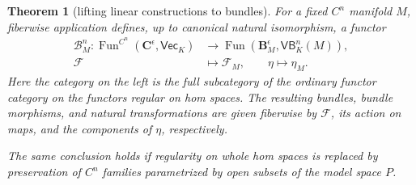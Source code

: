 \documentclass[11pt]{amsart}
\newtheorem{theorem}{Theorem}[section]
\theoremstyle{definition}
\theoremstyle{remark}
\numberwithin{equation}{section}
\theoremstyle{plain}
\theoremstyle{definition}
\theoremstyle{plain}
\begin{document}
\begin{theorem}[lifting linear constructions to bundles]\label{thm:bundle-lifting}
For a fixed $C^n$ manifold $M$, fiberwise application defines, up to canonical natural isomorphism, a functor
\[
\begin{aligned}
 \mathcal B_M^n\colon
 \operatorname{Fun}^{C^n}(\mathbf C^\epsilon,\mathsf{Vec}_K)
 &\longrightarrow
 \operatorname{Fun}(\mathbf B^\epsilon_M,\mathsf{VB}^n_K(M)),\\
 \mathcal F&\longmapsto\mathcal F_M,\qquad
 \eta\longmapsto\eta_M.
\end{aligned}
\]
Here the category on the left is the full subcategory of the ordinary functor category on the functors regular on hom spaces. The resulting bundles, bundle morphisms, and natural transformations are given fiberwise by $\mathcal F$, its action on maps, and the components of $\eta$, respectively.

The same conclusion holds if regularity on whole hom spaces is replaced by preservation of $C^n$ families parametrized by open subsets of the model space $P$.
\end{theorem}
\end{document}
